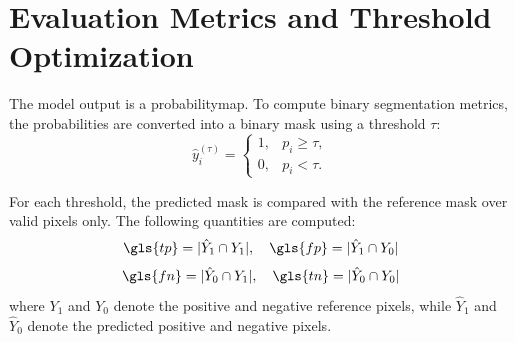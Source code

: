 \section{Evaluation Metrics and Threshold Optimization}

The model output is a \gls{probabilitymap}. To compute binary segmentation metrics, the probabilities are converted into a binary mask using a threshold $\tau$:
\begin{equation}
    \hat{y}_i^{(\tau)} =
    \begin{cases}
        1, & p_i \geq \tau, \\
        0, & p_i < \tau.
    \end{cases}
\end{equation}

For each threshold, the predicted mask is compared with the reference mask over valid pixels only. The following quantities are computed:
\begin{equation}
    \gls{tp} = |\hat{Y}_{1} \cap Y_{1}|,\quad
    \gls{fp} = |\hat{Y}_{1} \cap Y_{0}|
\end{equation}
\begin{equation}
    \gls{fn} = |\hat{Y}_{0} \cap Y_{1}|,\quad
    \gls{tn} = |\hat{Y}_{0} \cap Y_{0}|
\end{equation}
where $Y_1$ and $Y_0$ denote the positive and negative reference pixels, while $\hat{Y}_1$ and $\hat{Y}_0$ denote the predicted positive and negative pixels.

